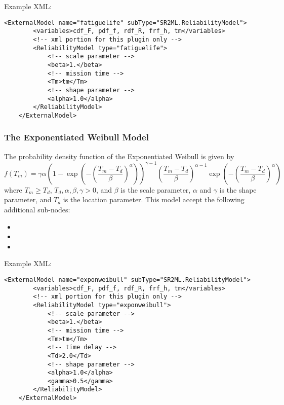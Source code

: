 Example XML:
\begin{lstlisting}[style=XML]
	<ExternalModel name="fatiguelife" subType="SR2ML.ReliabilityModel">
		<variables>cdf_F, pdf_f, rdf_R, frf_h, tm</variables>
		<!-- xml portion for this plugin only -->
		<ReliabilityModel type="fatiguelife">
			<!-- scale parameter -->
			<beta>1.</beta>
			<!-- mission time -->
			<Tm>tm</Tm>
			<!-- shape parameter -->
			<alpha>1.0</alpha>
		</ReliabilityModel>
	</ExternalModel>
\end{lstlisting}


\subsubsection{The Exponentiated Weibull Model}
The probability density function of the Exponentiated Weibull is given by
\begin{equation}
	f(T_m) = \gamma\alpha\left(1-\exp\left(-\left(\frac{T_m-T_d}{\beta}\right)^\alpha\right)\right)^{\gamma-1}
				 \left(\frac{T_m-T_d}{\beta}\right)^{\alpha-1}\exp\left(-\left(\frac{T_m-T_d}{\beta}\right)^\alpha\right)
\end{equation}
where $T_m\geq T_d$, $T_d, \alpha, \beta, \gamma>0$, and $\beta$ is the scale parameter, $\alpha$ and $\gamma$ is the shape
parameter, and $T_d$ is the location parameter.
This model accept the following additional sub-nodes:
\begin{itemize}
	\item {}
	\item {}
	\item {}
\end{itemize}

Example XML:
\begin{lstlisting}[style=XML]
	<ExternalModel name="exponweibull" subType="SR2ML.ReliabilityModel">
		<variables>cdf_F, pdf_f, rdf_R, frf_h, tm</variables>
		<!-- xml portion for this plugin only -->
		<ReliabilityModel type="exponweibull">
			<!-- scale parameter -->
			<beta>1.</beta>
			<!-- mission time -->
			<Tm>tm</Tm>
			<!-- time delay -->
			<Td>2.0</Td>
			<!-- shape parameter -->
			<alpha>1.0</alpha>
			<gamma>0.5</gamma>
		</ReliabilityModel>
	</ExternalModel>
\end{lstlisting}


